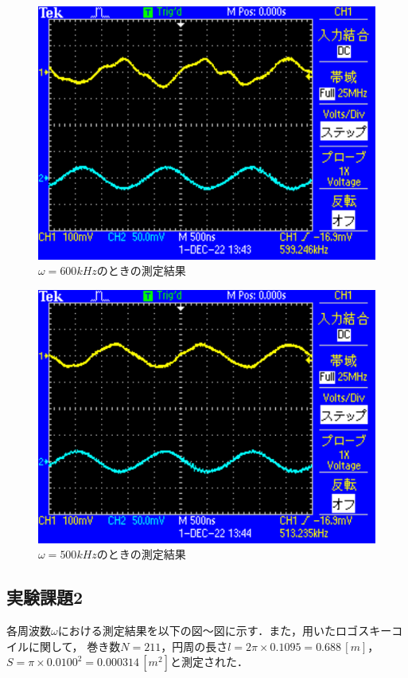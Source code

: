 \begin{figure}[H]
    \centering
    \includegraphics[scale=0.5]{TEK0005.pdf}
    \caption{$\omega=600\si{kHz}$のときの測定結果}
\end{figure}

\begin{figure}[H]
    \centering
    \includegraphics[scale=0.5]{TEK0006.pdf}
    \caption{$\omega=500\si{kHz}$のときの測定結果}
\end{figure}

\newpage

\subsection{実験課題2}
各周波数$\omega$における測定結果を以下の図～図に示す．また，用いたロゴスキーコイルに関して，
巻き数$N=211$，円周の長さ$l=2\pi\times 0.1095=0.688\,[\si{m}]$，
$S=\pi\times 0.0100^2=0.000314\,[\si{m^2}]$と測定された．

